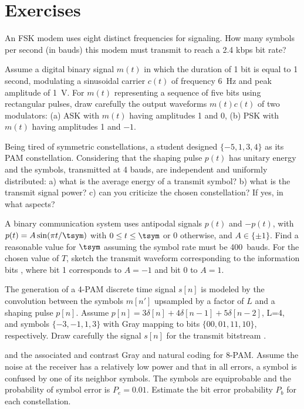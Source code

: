 \section{Exercises}
%
\begin{exercises}

\item An FSK modem uses eight distinct frequencies for signaling. How many symbols per second (in bauds) this modem must transmit to reach a 2.4 kbps bit rate?

\item Assume a digital binary signal $m(t)$ in which the duration of 1 bit is equal to 1 second, modulating a sinusoidal carrier $c(t)$ of frequency 6~Hz and peak amplitude of 1~V. For $m(t)$ representing a sequence of five bits  using rectangular pulses, draw carefully the output waveforms $m(t)c(t)$ of two modulators: (a) ASK with $m(t)$ having amplitudes 1 and 0, (b) PSK with $m(t)$ having amplitudes 1 and $-1$.

\item Being tired of symmetric constellations, a student designed $\{-5, 1, 3, 4\}$ as its PAM constellation. Considering that the shaping pulse $p(t)$ has unitary energy and the symbols, transmitted at 4 bauds, are independent and uniformly distributed: a) what is the average energy of a transmit symbol? b) what is the transmit signal power? c) can you criticize the chosen constellation? If yes, in what aspects?

\item A binary communication system uses antipodal signals $p(t)$ and $-p(t)$, with $p(t) = A \sin (\pi t/\tsym)$ with $0 \le t \le \tsym$ or 0 otherwise, and $A \in \{ \pm 1 \}$. Find a reasonable value for $\tsym$ assuming the symbol rate must be 400~bauds. For the chosen value of $T$, sketch the transmit waveform corresponding to the information bits \ci{[0 1 0 0 1 0]}, where bit 1 corresponds to $A=-1$ and bit 0 to $A=1$.

\item The generation of a 4-PAM discrete time signal  $s[n]$ is modeled by the convolution between the symbols $m[n']$ upsampled by a factor of $L$ and a shaping pulse $p[n]$. Assume $p[n] = 3 \delta[n] + 4 \delta[n-1] + 5 \delta[n-2]$, L=4, and symbols $\{-3, -1, 1, 3\}$ with Gray mapping to bits $\{00, 01, 11, 10\}$, respectively. Draw carefully the signal $s[n] $ for the transmit bitstream . 

\item {} and the associated  and  contrast Gray and natural coding for 8-PAM. Assume the noise at the receiver has a relatively low power and that in all errors, a symbol is confused by one of its neighbor symbols. The symbols are equiprobable and the probability of symbol error is $P_e = 0.01$. Estimate the bit error probability $P_b$ for each constellation.


\end{exercises}
